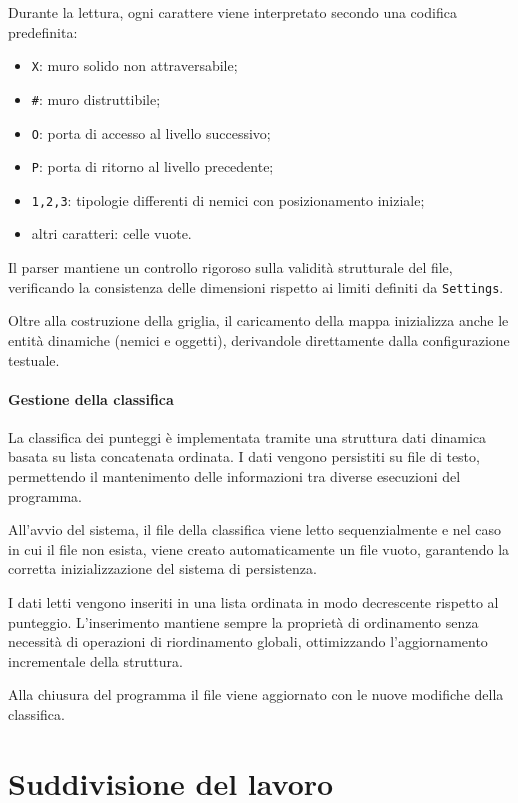 \documentclass[a4paper,11pt]{article}
\begin{document}
Durante la lettura, ogni carattere viene interpretato secondo una codifica predefinita:

\begin{itemize}
    \item \texttt{X}: muro solido non attraversabile;
    \item \texttt{\#}: muro distruttibile;
    \item \texttt{O}: porta di accesso al livello successivo;
    \item \texttt{P}: porta di ritorno al livello precedente;
    \item \texttt{1,2,3}: tipologie differenti di nemici con posizionamento iniziale;
    \item altri caratteri: celle vuote.
\end{itemize}

Il parser mantiene un controllo rigoroso sulla validità strutturale del file, 
verificando la consistenza delle dimensioni rispetto ai limiti definiti da \texttt{Settings}. 

Oltre alla costruzione della griglia, il caricamento della mappa inizializza anche le entità dinamiche 
(nemici e oggetti), derivandole direttamente dalla configurazione testuale. 

\paragraph{Gestione della classifica}

La classifica dei punteggi è implementata tramite una struttura dati dinamica basata su lista concatenata ordinata. 
I dati vengono persistiti su file di testo, permettendo il mantenimento delle informazioni tra diverse esecuzioni del programma.

All'avvio del sistema, il file della classifica viene letto sequenzialmente e nel caso in cui 
il file non esista, viene creato automaticamente un file vuoto, garantendo la corretta inizializzazione del sistema di persistenza.

I dati letti vengono inseriti in una lista ordinata in modo decrescente rispetto al punteggio. 
L'inserimento mantiene sempre la proprietà di ordinamento senza necessità di operazioni di riordinamento globali, 
ottimizzando l'aggiornamento incrementale della struttura.

Alla chiusura del programma il file viene aggiornato con le nuove modifiche della classifica.

\section{Suddivisione del lavoro}
\end{document}
